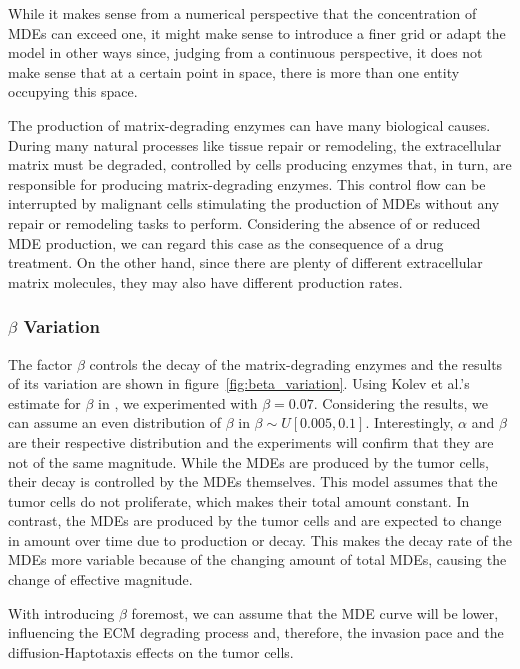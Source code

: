 While it makes sense from a numerical perspective that the concentration of MDEs can exceed one, it might make sense to introduce a finer grid or adapt the model in other ways since, judging from a continuous perspective, it does not make sense that at a certain point in space, there is more than one entity occupying this space.

The production of matrix-degrading enzymes can have many biological causes. During many natural processes like tissue repair or remodeling, the extracellular matrix must be degraded, controlled by cells producing enzymes that, in turn, are responsible for producing matrix-degrading enzymes. This control flow can be interrupted by malignant cells stimulating the production of MDEs without any repair or remodeling tasks to perform. Considering the absence of or reduced MDE production, we can regard this case as the consequence of a drug treatment. On the other hand, since there are plenty of different extracellular matrix molecules, they may also have different production rates.


\subsubsection*{$\beta$ Variation}
The factor $\beta$ controls the decay of the matrix-degrading enzymes and the results of its variation are shown in figure~\ref{fig:beta_variation}. Using Kolev et al.'s estimate for $\beta$ in \cite{Kolev2010}, we experimented with $\beta=0.07$. Considering the results, we can assume an even distribution of $\beta$ in $\beta \sim U[0.005, 0.1]$. Interestingly, $\alpha$ and $\beta$ are their respective distribution and the experiments will confirm that they are not of the same magnitude. While the MDEs are produced by the tumor cells, their decay is controlled by the MDEs themselves. This model assumes that the tumor cells do not proliferate, which makes their total amount constant. In contrast, the MDEs are produced by the tumor cells and are expected to change in amount over time due to production or decay. This makes the decay rate of the MDEs more variable because of the changing amount of total MDEs, causing the change of effective magnitude.

With introducing $\beta$ foremost, we can assume that the MDE curve will be lower, influencing the ECM degrading process and, therefore, the invasion pace and the diffusion-Haptotaxis effects on the tumor cells. 

